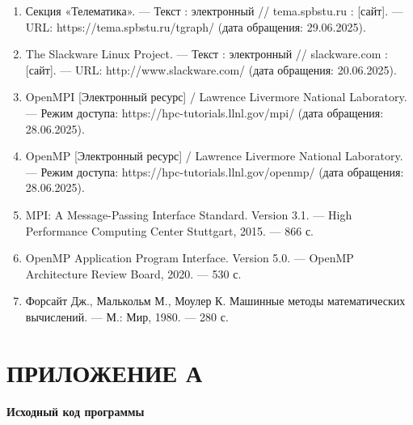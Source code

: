 \documentclass[11pt,a4paper,final]{article}
\begin{document}
\begin{enumerate}
	\item Секция «Телематика». — Текст : электронный // tema.spbstu.ru : [сайт]. — URL: https://tema.spbstu.ru/tgraph/ (дата обращения: 29.06.2025).
	\item The Slackware Linux Project. — Текст : электронный // slackware.com : [сайт]. — URL: http://www.slackware.com/ (дата обращения: 20.06.2025).
	\item OpenMPI [Электронный ресурс] / Lawrence Livermore National Laboratory. — Режим доступа: https://hpc-tutorials.llnl.gov/mpi/ (дата обращения: 28.06.2025).
	\item OpenMP [Электронный ресурс] / Lawrence Livermore National Laboratory. — Режим доступа: https://hpc-tutorials.llnl.gov/openmp/ (дата обращения: 28.06.2025).
	\item MPI: A Message-Passing Interface Standard. Version 3.1. — High Performance Computing Center Stuttgart, 2015. — 866 с.
	\item OpenMP Application Program Interface. Version 5.0. — OpenMP Architecture Review Board, 2020. — 530 с.
	\item Форсайт Дж., Малькольм М., Моулер К. Машинные методы математических вычислений. — М.: Мир, 1980. — 280 с.
\end{enumerate}

\newpage
\section*{ПРИЛОЖЕНИЕ А}

\textbf{Исходный код программы}
	
\end{document}
